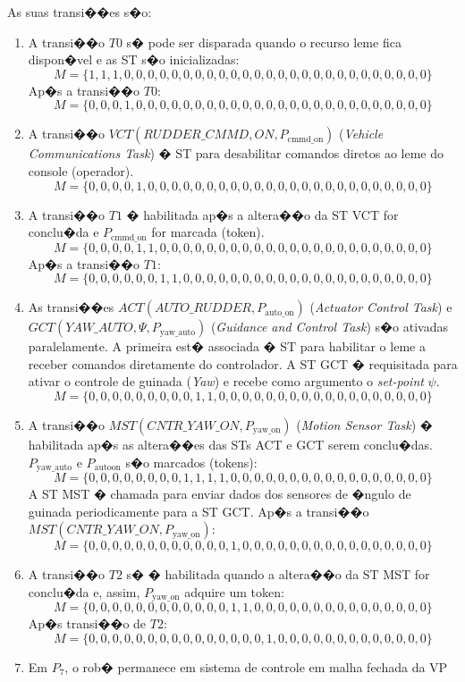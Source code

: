 As suas transi��es s�o:
\begin{enumerate}
  \item A transi��o $T0$ s� pode ser disparada quando o recurso leme fica
  dispon�vel e as ST s�o inicializadas:
 $$M
=\{1,1,1,0,0,0,0,0,0,0,0,0,0,0,0,0,0,0,0,0,0,0,0,0,0,0,0,0,0\}$$
Ap�s a transi��o $T0$:
  $$M
=\{0,0,0,1,0,0,0,0,0,0,0,0,0,0,0,0,0,0,0,0,0,0,0,0,0,0,0,0,0\}$$  
  \item A transi��o $VCT(RUDDER\_CMMD,ON,P_{\textrm{cmmd\_on}})$
  (\emph{Vehicle Communications Task}) � ST para desabilitar comandos diretos ao
  leme do console (operador).
$$M
=\{0,0,0,0,1,0,0,0,0,0,0,0,0,0,0,0,0,0,0,0,0,0,0,0,0,0,0,0,0\}$$ 
  \item A transi��o $T1$ � habilitada ap�s a altera��o da ST VCT for conclu�da
  e $P_{\textrm{cmmd\_on}}$ for marcada (token). $$M
=\{0,0,0,0,1,1,0,0,0,0,0,0,0,0,0,0,0,0,0,0,0,0,0,0,0,0,0,0,0\}$$
Ap�s a transi��o $T1$:
$$M
=\{0,0,0,0,0,0,1,1,0,0,0,0,0,0,0,0,0,0,0,0,0,0,0,0,0,0,0,0,0\}$$
  \item As transi��es $ACT(AUTO\_RUDDER,P_{\textrm{auto\_on}})$
  (\emph{Actuator Control Task}) e $GCT(YAW\_AUTO,\Psi,P_{\textrm{yaw\_auto}})$
  (\emph{Guidance and Control Task}) s�o ativadas paralelamente. A primeira est�
  associada � ST para habilitar o leme a receber comandos diretamente do
  controlador. A ST GCT � requisitada para ativar o controle de guinada
  (\emph{Yaw}) e recebe como argumento o \emph{set-point} $\psi$.
$$M
=\{0,0,0,0,0,0,0,0,0,1,1,0,0,0,0,0,0,0,0,0,0,0,0,0,0,0,0,0,0\}$$
  \item A transi��o $MST(CNTR\_YAW\_ON,P_{\textrm{yaw\_on}})$ (\emph{Motion
  Sensor Task}) � habilitada ap�s as altera��es das STs ACT e GCT serem
  conclu�das.
  $P_{\textrm{yaw\_auto}}$ e $P_{\textrm{autoon}}$ s�o marcados (tokens):
  $$M
=\{0,0,0,0,0,0,0,0,1,1,1,1,0,0,0,0,0,0,0,0,0,0,0,0,0,0,0,0,0\}$$
A ST MST � chamada para enviar dados dos sensores de �ngulo de guinada
periodicamente para a ST GCT.
Ap�s a transi��o
$MST(CNTR\_YAW\_ON,P_{\textrm{yaw\_on}})$:
  $$M
=\{0,0,0,0,0,0,0,0,0,0,0,0,1,0,0,0,0,0,0,0,0,0,0,0,0,0,0,0,0\}$$
  \item A transi��o $T2$ s� � habilitada quando a altera��o da ST MST for
  conclu�da e, assim, $P_{\textrm{yaw\_on}}$ adquire um token:
    $$M
=\{0,0,0,0,0,0,0,0,0,0,0,0,1,1,0,0,0,0,0,0,0,0,0,0,0,0,0,0,0\}$$
Ap�s transi��o de $T2$:
$$M
=\{0,0,0,0,0,0,0,0,0,0,0,0,0,0,0,1,0,0,0,0,0,0,0,0,0,0,0,0,0\}$$
  \item Em $P_7$, o rob� permanece em sistema de controle em malha fechada da VP

\end{enumerate}
